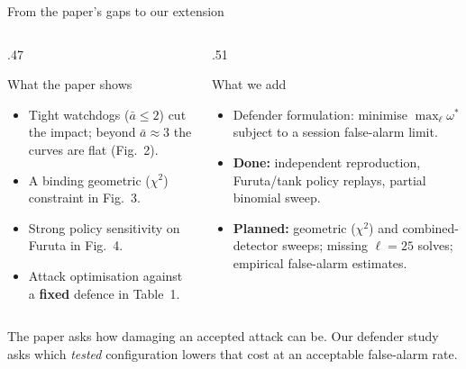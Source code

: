 \documentclass[8pt,aspectratio=169]{beamer}
\gdef\CPSOrigin{PAPER}%
\gdef\CPSSourceContext{}%
\begin{document}
\begin{frame}{From the paper's gaps to our extension}
\gdef\CPSSourceContext{}
\gdef\CPSOrigin{PAPER / OURS}
\begin{columns}[T,onlytextwidth]
\begin{column}{.47\textwidth}
\begin{block}{What the paper shows}
\small\begin{itemize}\setlength\itemsep{.6em}
\item Tight watchdogs ($\bar a\le2$) cut the impact; beyond $\bar a\approx3$ the curves are flat (Fig.~2).
\item A binding geometric ($\chi^2$) constraint in Fig.~3.
\item Strong policy sensitivity on Furuta in Fig.~4.
\item Attack optimisation against a \textbf{fixed} defence in Table~1.
\end{itemize}
\end{block}
\end{column}
\begin{column}{.51\textwidth}
\begin{block}{What we add}
\small\begin{itemize}\setlength\itemsep{.6em}
\item Defender formulation: minimise $\max_{\ell}\omega^*$ subject to a session false-alarm limit.
\item \textbf{Done:} independent reproduction, Furuta/tank policy replays, partial binomial sweep.
\item \textbf{Planned:} geometric ($\chi^2$) and combined-detector sweeps; missing $\ell=25$ solves; empirical false-alarm estimates.
\end{itemize}
\end{block}
\end{column}
\end{columns}
\medskip\small The paper asks how damaging an accepted attack can be. Our defender study asks which \emph{tested} configuration lowers that cost at an acceptable false-alarm rate.
\end{frame}


\endgroup

\begingroup
\makeatletter
\newcommand{\CPSAbhiAbar}{\ensuremath{\bar a}}
\newcommand{\CPSAbhiPhatm}{\ensuremath{\hat p_{\mathrm m}}}
\newcommand{\CPSAbhiTakeaway}[1]{{\small\color{black!80}#1\par}\vspace{1.2ex}}
\newcommand{\CPSAbhiCode}[1]{{\ttfamily #1}}
\end{document}
